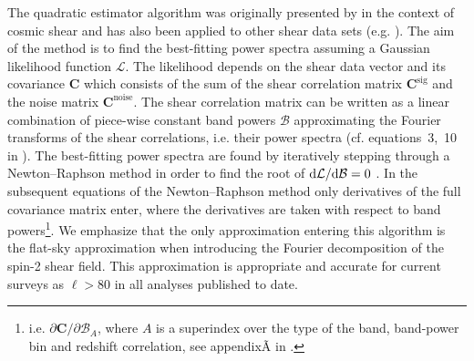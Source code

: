 The quadratic estimator algorithm was originally presented by \citet{Hu2001} in the context of cosmic shear and has also been applied to other shear data sets (e.g. \citealt{Brown2003, Heymans2005, Lin2012}).   The aim of the method is to find the best-fitting power spectra assuming a Gaussian likelihood function $\mathcal{L}$. The likelihood depends on the shear data vector and its covariance $\mathbf{C}$ which consists of the sum of the shear correlation matrix $\mathbf{C}^\mathrm{sig}$ and the noise matrix $\mathbf{C}^\mathrm{noise}$. The shear correlation matrix can be written as a linear combination of piece-wise constant band powers $\mathcal{B}$ approximating the Fourier transforms of the shear correlations, i.e. their power spectra (cf. equations~3,~10 in \citealt{Koehlinger2016}). The best-fitting power spectra are found by iteratively stepping through a Newton--Raphson method in order to find the root of $\mathrm{d} \mathcal{L}/ \mathrm{d} \mathcal{B} = 0$ \citep{Bond1998, Seljak1998}. In the subsequent equations of the Newton--Raphson method only derivatives of the full covariance matrix enter, where the derivatives are taken with respect to band powers\footnote{i.e. $\partial \mathbf{C} / \partial \mathcal{B}_A$, where $A$ is a superindex over the type of the band, band-power bin and redshift correlation, see appendix\~A in \citealt{Koehlinger2016}.}.  We emphasize that the only approximation entering this algorithm is the flat-sky approximation when introducing the Fourier decomposition of the spin-2 shear field.    This approximation is appropriate and accurate for current surveys as $\ell>80$  in all analyses published to date.
